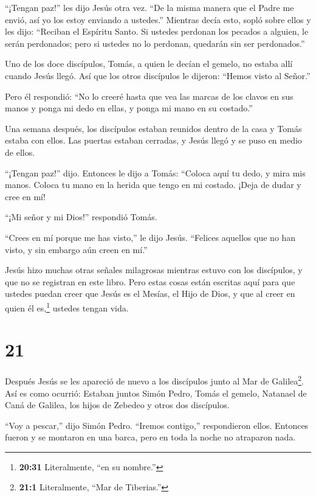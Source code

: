  ``¡Tengan paz!'' les dijo Jesús otra vez. ``De la misma
manera que el Padre me envió, así yo los estoy enviando a ustedes.''
 Mientras decía esto, sopló sobre ellos y les dijo:
``Reciban el Espíritu Santo.  Si ustedes perdonan los
pecados a alguien, le serán perdonados; pero si ustedes no lo perdonan,
quedarán sin ser perdonados.''

 Uno de los doce discípulos, Tomás, a quien le decían el
gemelo, no estaba allí cuando Jesús llegó.  Así que los
otros discípulos le dijeron: ``Hemos visto al Señor.''

Pero él respondió: ``No lo creeré hasta que vea las marcas de los clavos
en sus manos y ponga mi dedo en ellas, y ponga mi mano en su costado.''

 Una semana después, los discípulos estaban reunidos dentro
de la casa y Tomás estaba con ellos. Las puertas estaban cerradas, y
Jesús llegó y se puso en medio de ellos.

``¡Tengan paz!'' dijo.  Entonces le dijo a Tomás: ``Coloca
aquí tu dedo, y mira mis manos. Coloca tu mano en la herida que tengo en
mi costado. ¡Deja de dudar y cree en mí!

 ``¡Mi señor y mi Dios!'' respondió Tomás.

 ``Crees en mí porque me has visto,'' le dijo Jesús.
``Felices aquellos que no han visto, y sin embargo aún creen en mí.''

 Jesús hizo muchas otras señales milagrosas mientras estuvo
con los discípulos, y que no se registran en este libro. 
Pero estas cosas están escritas aquí para que ustedes puedan creer que
Jesús es el Mesías, el Hijo de Dios, y que al creer en quien él
es,\footnote{\textbf{20:31} Literalmente, ``en su nombre.''} ustedes
tengan vida.

\hypertarget{section-20}{%
\section{21}\label{section-20}}

 Después Jesús se les apareció de nuevo a los discípulos
junto al Mar de Galilea\footnote{\textbf{21:1} Literalmente, ``Mar de
  Tiberias.''}. Así es como ocurrió:  Estaban juntos Simón
Pedro, Tomás el gemelo, Natanael de Caná de Galilea, los hijos de
Zebedeo y otros dos discípulos.

 ``Voy a pescar,'' dijo Simón Pedro. ``Iremos contigo,''
respondieron ellos. Entonces fueron y se montaron en una barca, pero en
toda la noche no atraparon nada.

